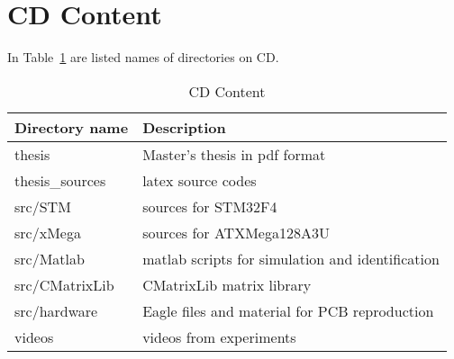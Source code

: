 \section{CD Content}

In Table~\ref{tab:obsah} are listed names of directories on CD.

\vspace{1cm}
\begin{table}[!htb]
\centering
\begin{tabular}{lp{10cm}}
\hline
\textbf{Directory name} & \textbf{Description} \\
\hline
thesis & Master's thesis in pdf format\\
thesis\_sources & latex source codes \\
src/STM & sources for STM32F4 \\
src/xMega & sources for ATXMega128A3U \\
src/Matlab & matlab scripts for simulation and identification \\
src/CMatrixLib & CMatrixLib matrix library \\
src/hardware & Eagle files and material for PCB reproduction\\
videos & videos from experiments \\
\hline
\end{tabular}
\caption{CD Content}
\label{tab:obsah}
\end{table}